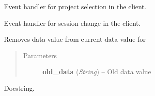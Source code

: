 \documentclass[letterpaper,10pt,english]{sphinxmanual}
\begin{document}
\begin{fulllineitems}
\begin{fulllineitems}
\begin{quote}
\begin{description}
\end{description}\end{quote}

\end{fulllineitems}


\begin{fulllineitems}
\label{state:state.State.on_project_selected}
Event handler for project selection in the client.

\end{fulllineitems}


\begin{fulllineitems}
\label{state:state.State.on_session_changed}
Event handler for session change in the client.

\end{fulllineitems}


\begin{fulllineitems}
\label{state:state.State.remove_from_swnp_data}
Removes data value from current data value for {\hyperref[swnp:swnp.Node]{}}
\begin{quote}\begin{description}
\item[{Parameters}] \leavevmode
\textbf{old\_data} (\emph{String}) -- Old data value

\end{description}\end{quote}

\end{fulllineitems}


\begin{fulllineitems}
\label{state:state.State.remove_observer}
Docstring.

\end{fulllineitems}



\end{fulllineitems}
\end{document}
